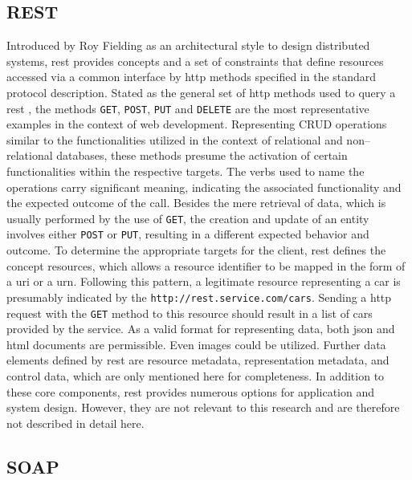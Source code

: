 \subsection{REST}
\label{ch:Fundamentals:sec:Data Exchange:ssec:REST}

Introduced by Roy Fielding as an architectural style \cite{patni_pro_2017} to design distributed systems, \acrfull{rest} provides concepts and a set of constraints that define resources accessed via a common interface by \acrshort{http} methods specified in the standard protocol description.
Stated as the general set of \acrshort{http} methods used to query a \acrshort{rest} , the methods \verb|GET|, \verb|POST|, \verb|PUT| and \verb|DELETE| are the most representative examples in the context of web development. 
Representing CRUD operations similar to the functionalities utilized in the context of relational and non--relational databases, these methods presume the activation of certain functionalities within the respective targets.
The verbs used to name the operations carry significant meaning, indicating the associated functionality and the expected outcome of the call.
Besides the mere retrieval of data, which is usually performed by the use of \verb|GET|, the creation and update of an entity involves either \verb|POST| or \verb|PUT|, resulting in a different expected behavior and outcome.
To determine the appropriate targets for the client, \acrshort{rest} defines the concept resources, which allows a resource identifier to be mapped in the form of a \acrshort{uri} or a \acrshort{urn}. Following this pattern, a legitimate resource representing a car is presumably indicated by the  \verb|http://rest.service.com/cars|. 
Sending a \acrshort{http} request with the \verb|GET| method to this resource should result in a list of cars provided by the service. As a valid format for representing data, both \acrshort{json} and \acrshort{html} documents are permissible. Even images could be utilized.
Further data elements defined by \acrshort{rest} are resource metadata, representation metadata, and control data, which are only mentioned here for completeness. 
In addition to these core components, \acrshort{rest} provides numerous options for application and system design. However, they are not relevant to this research and are therefore not described in detail here.

\subsection{SOAP}
\label{ch:Fundamentals:sec:Data Exchange:ssec:SOAP}

